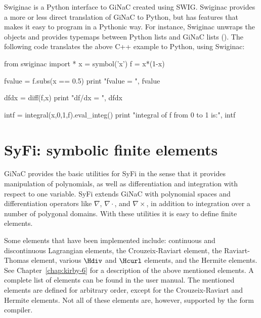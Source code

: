 Swiginac is a Python interface to GiNaC created using SWIG.  Swiginac
provides a more or less direct translation of GiNaC to Python, but has
features that makes it easy to program in a Pythonic way.  For instance,
Swiginac unwraps the  objects and provides typemaps between
Python lists and GiNaC lists ().  The following code translates
the above C++ example to Python, using Swiginac:
\begin{python}
from swiginac import *
x = symbol('x')
f = x*(1-x)

fvalue = f.subs(x == 0.5)
print "fvalue = ", fvalue

dfdx = diff(f,x)
print "df/dx = ", dfdx

intf = integral(x,0,1,f).eval_integ()
print "integral of f from 0 to 1 is:", intf
\end{python}

\section{SyFi: symbolic finite elements}

GiNaC provides the basic utilities for SyFi in the sense that it provides
manipulation of polynomials, as well as differentiation and integration
with respect to one variable. SyFi extends GiNaC with polynomial
spaces and differentiation operators like $\nabla$, $\nabla\cdot$, and
$\nabla\times$, in addition to integration over a number of polygonal
domains.  With these utilities it is easy to define finite elements.

Some elements that have been implemented include: continuous and
discontinuous Lagrangian elements, the Crouzeix-Raviart element, the
Raviart-Thomas element, various $\Hdiv$ and $\Hcurl$ \nedelec{} elements, and
the Hermite elements. See Chapter~\ref{chap:kirby-6} for a description of
the above mentioned elements.  A complete list of elements can be found in
the user manual. The mentioned elements are defined for arbitrary order,
except for the Crouzeix-Raviart and Hermite elements. Not all of these
elements are, however, supported by the form compiler.


